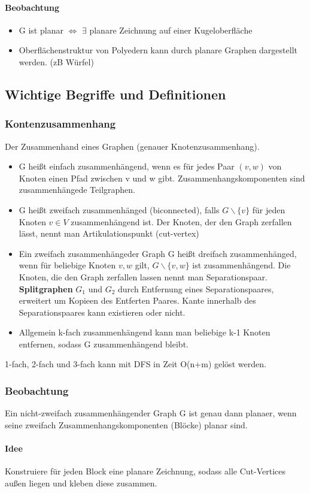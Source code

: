 \paragraph{Beobachtung}
\begin{itemize}
    \item  G ist planar $ \Leftrightarrow $ $ \exists $ planare Zeichnung auf einer Kugeloberfläche
    \item Oberflächenstruktur von Polyedern kann durch planare Graphen dargestellt werden. (zB Würfel)
\end{itemize}

\subsection{Wichtige Begriffe und Definitionen}
\subsubsection{Kontenzusammenhang}
Der Zusammenhand eines Graphen (genauer Knotenzusammenhang).
\begin{itemize}
    \item G heißt einfach zusammenhängend, wenn es für jedes Paar $ (v,w) $ von Knoten einen Pfad zwischen v und w gibt. Zusammenhangskomponenten sind zusammenhängede Teilgraphen.
    \item G heißt zweifach zusammenhänged (biconnected), falls $ G \backslash \{v\} $ für jeden Knoten $ v \in V $ zusammenhängend ist. Der Knoten, der den Graph zerfallen lässt, nennt man Artikulationspunkt (cut-vertex)
    \item Ein zweifach zusammenhängeder Graph G heißt dreifach zusammenhänged, wenn für beliebige Knoten $ v,w $ gilt, $ G\backslash \{v,w\} $ ist zusammenhängend. Die Knoten, die den Graph zerfallen lassen nennt man Separationspaar. \textbf{Splitgraphen} $ G_1 $ und $ G_2 $ durch Entfernung eines Separationspaares, erweitert um Kopieen des Entferten Paares. Kante innerhalb des Separationspaares kann existieren oder nicht.
    \item Allgemein k-fach zusammenhängend kann man beliebige k-1 Knoten entfernen, sodass G zusammenhängend bleibt.
\end{itemize}
1-fach, 2-fach und 3-fach kann mit DFS in Zeit O(n+m) gelöst werden.

\subsubsection{Beobachtung} Ein nicht-zweifach zusammenhängender Graph G ist genau dann planaer, wenn seine zweifach Zusammenhangskomponenten (Blöcke) planar sind. \paragraph{Idee}
Konstruiere für jeden Block eine planare Zeichnung, sodass alle Cut-Vertices außen liegen und kleben diese zusammen.

